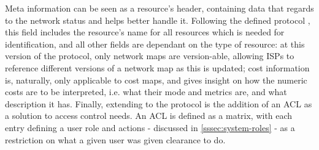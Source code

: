     Meta information can be seen as a resource's header, containing data that regards to the network status and helps better handle it.
    Following the defined protocol \cite{alto-protocol}, this field includes the resource's name for all resources which is needed for identification, and all other fields are dependant on the type of resource: at this version of the protocol, only network maps are version-able, allowing ISPs to reference different versions of a network map as this is updated; cost information is, naturally, only applicable to cost maps, and gives insight on how the numeric costs are to be interpreted, i.e. what their mode and metrics are, and what description it has.
    Finally, extending to the protocol is the addition of an ACL as a solution to access control needs.
    An ACL is defined as a matrix, with each entry defining a user role and actions - discussed in \ref{sssec:system-roles} - as a restriction on what a given user was given clearance to do.

